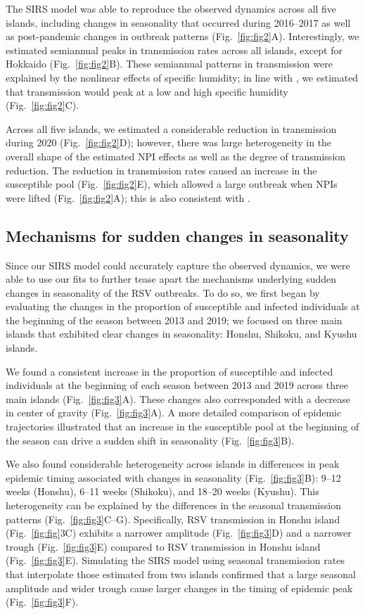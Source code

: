 \documentclass[12pt]{article}
\newcommand{\fref}[1]{Fig.~\ref{fig:#1}}
\begin{document}
The SIRS model was able to reproduce the observed dynamics across all five islands, including changes in seasonality that occurred during 2016--2017 as well as post-pandemic changes in outbreak patterns (\fref{fig2}A).
Interestingly, we estimated semiannual peaks in transmission rates across all islands, except for Hokkaido (\fref{fig2}B).
These semiannual patterns in transmission were explained by the nonlinear effects of specific humidity;
in line with \cite{baker2019epidemic}, we estimated that transmission would peak at a low and high specific humidity (\fref{fig2}C).

Across all five islands, we estimated a considerable reduction in transmission during 2020  (\fref{fig2}D);
however, there was large heterogeneity in the overall shape of the estimated NPI effects as well as the degree of transmission reduction.
The reduction in transmission rates caused an increase in the susceptible pool (\fref{fig2}E), which allowed a large outbreak when NPIs were lifted (\fref{fig2}A);
this is also consistent with \cite{baker2019epidemic}.

\subsection*{Mechanisms for sudden changes in seasonality}

Since our SIRS model could accurately capture the observed dynamics, we were able to use our fits to further tease apart the mechanisms underlying sudden changes in seasonality of the RSV outbreaks.
To do so, we first began by evaluating the changes in the proportion of susceptible and infected individuals at the beginning of the season between 2013 and 2019;
we focused on three main islands that exhibited clear changes in seasonality: Honshu, Shikoku, and Kyushu islands. 

We found a consistent increase in the proportion of susceptible and infected individuals at the beginning of each season between 2013 and 2019 across three main islands (\fref{fig3}A).
These changes also corresponded with a decrease in center of gravity (\fref{fig3}A).
A more detailed comparison of epidemic trajectories illustrated that an increase in the susceptible pool at the beginning of the season can drive a sudden shift in seasonality (\fref{fig3}B).

We also found considerable heterogeneity across islands in differences in peak epidemic timing associated with changes in seasonality (\fref{fig3}B): 9--12 weeks (Honshu), 6--11 weeks (Shikoku), and 18--20 weeks (Kyushu).
This heterogeneity can be explained by the differences in the seasonal transmission patterns (\fref{fig3}C--G).
Specifically, RSV transmission in Honshu island (\fref{fig}3C) exhibits a narrower amplitude (\fref{fig3}D) and a narrower trough (\fref{fig3}E) compared to RSV transmission in Honshu island (\fref{fig3}E).
Simulating the SIRS model using seasonal transmission rates that interpolate those estimated from two islands confirmed that a large seasonal amplitude and wider trough cause larger changes in the timing of epidemic peak (\fref{fig3}F). 
\end{document}
